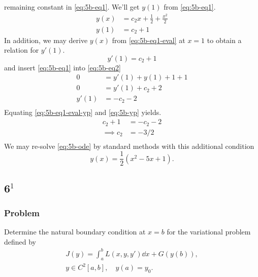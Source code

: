 \documentclass[12pt,twoside]{article}
\begin{document}
remaining constant in \cref{eq:5b-eq1}. We'll get $y(1)$ from \cref{eq:5b-eq1}.
\begin{equation}
  \label{eq:5b-eq1-eval}
  \begin{aligned}
    y(x) &= c_2x + \frac{1}{2} + \frac{x^2}{2} \\
    y(1) &= c_2 + 1
  \end{aligned}
\end{equation}
In addition, we may derive $y(x)$ from \cref{eq:5b-eq1-eval} at $x=1$ to obtain
a relation for $y'(1)$.
\begin{equation}
  \label{eq:5b-eq1-eval-yp}
  y'(1) = c_2 + 1
\end{equation}
and insert \cref{eq:5b-eq1} into \cref{eq:5b-eq2}
\begin{equation}
  \label{eq:5b-yp}
  \begin{aligned}
    0 &= y'(1) + y(1) + 1  + 1 \\
    0 &= y'(1) + c_2 + 2 \\
    y'(1) &= -c_2 - 2 \\
  \end{aligned}
\end{equation}
Equating \cref{eq:5b-eq1-eval-yp} and \cref{eq:5b-yp} yields.
\begin{equation*}
  \begin{aligned}
    c_2 + 1 &= -c_2 - 2 \\
    \implies c_2 &= -3/2 \\
  \end{aligned}
\end{equation*}
We may re-solve \cref{eq:5b-ode} by standard methods with this additional condition
\begin{equation*}
\boxed{y(x) = \frac{1}{2} \left(x^2-5 x+1\right).}
\end{equation*}

\subsection{6$^1$}
\subsubsection*{Problem}
Determine the natural boundary condition at $x=b$ for the variational problem
defined by
\begin{equation}
  \begin{aligned}
    J(y) = \int_a^b L(x,y,y')\dd{x}+G(y(b)), \\
    y\in C^2[a,b],\quad y(a)=y_0. \\
  \end{aligned}
\end{equation}
\end{document}
